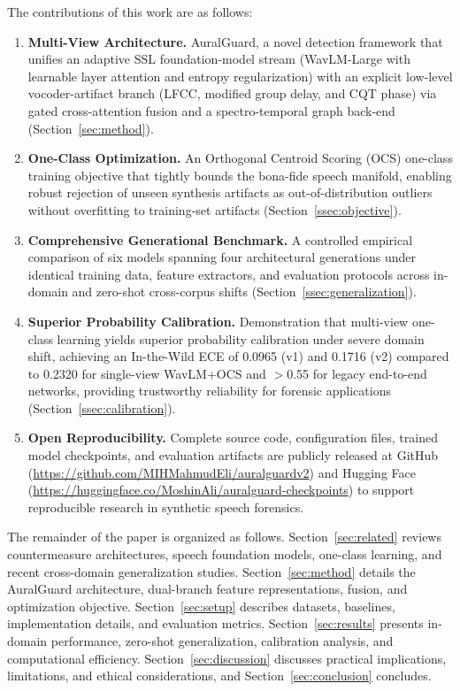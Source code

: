 The contributions of this work are as follows:
\begin{enumerate}
    \item \textbf{Multi-View Architecture.} AuralGuard, a novel detection framework that unifies an adaptive SSL foundation-model stream (WavLM-Large with learnable layer attention and entropy regularization) with an explicit low-level vocoder-artifact branch (LFCC, modified group delay, and CQT phase) via gated cross-attention fusion and a spectro-temporal graph back-end (Section~\ref{sec:method}).
    \item \textbf{One-Class Optimization.} An Orthogonal Centroid Scoring (OCS) one-class training objective that tightly bounds the bona-fide speech manifold, enabling robust rejection of unseen synthesis artifacts as out-of-distribution outliers without overfitting to training-set artifacts (Section~\ref{ssec:objective}).
    \item \textbf{Comprehensive Generational Benchmark.} A controlled empirical comparison of six models spanning four architectural generations under identical training data, feature extractors, and evaluation protocols across in-domain and zero-shot cross-corpus shifts (Section~\ref{ssec:generalization}).
    \item \textbf{Superior Probability Calibration.} Demonstration that multi-view one-class learning yields superior probability calibration under severe domain shift, achieving an In-the-Wild ECE of 0.0965 (v1) and 0.1716 (v2) compared to 0.2320 for single-view WavLM+OCS and $>$0.55 for legacy end-to-end networks, providing trustworthy reliability for forensic applications (Section~\ref{ssec:calibration}).
    \item \textbf{Open Reproducibility.} Complete source code, configuration files, trained model checkpoints, and evaluation artifacts are publicly released at GitHub (\url{https://github.com/MIHMahmudEli/auralguardv2}) and Hugging Face (\url{https://huggingface.co/MoshinAli/auralguard-checkpoints}) to support reproducible research in synthetic speech forensics.
\end{enumerate}

The remainder of the paper is organized as follows. Section~\ref{sec:related} reviews countermeasure architectures, speech foundation models, one-class learning, and recent cross-domain generalization studies. Section~\ref{sec:method} details the AuralGuard architecture, dual-branch feature representations, fusion, and optimization objective. Section~\ref{sec:setup} describes datasets, baselines, implementation details, and evaluation metrics. Section~\ref{sec:results} presents in-domain performance, zero-shot generalization, calibration analysis, and computational efficiency. Section~\ref{sec:discussion} discusses practical implications, limitations, and ethical considerations, and Section~\ref{sec:conclusion} concludes.
